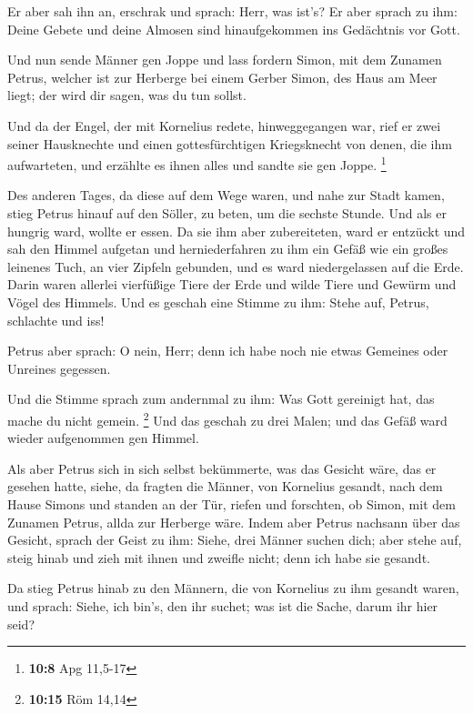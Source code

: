  Er aber sah ihn an, erschrak und sprach: Herr, was ist's?
Er aber sprach zu ihm: Deine Gebete und deine Almosen sind
hinaufgekommen ins Gedächtnis vor Gott.

 Und nun sende Männer gen Joppe und lass fordern Simon,
mit dem Zunamen Petrus,  welcher ist zur Herberge bei
einem Gerber Simon, des Haus am Meer liegt; der wird dir sagen, was du
tun sollst.

 Und da der Engel, der mit Kornelius redete,
hinweggegangen war, rief er zwei seiner Hausknechte und einen
gottesfürchtigen Kriegsknecht von denen, die ihm aufwarteten,
 und erzählte es ihnen alles und sandte sie gen Joppe.
\footnote{\textbf{10:8} Apg 11,5-17}

 Des anderen Tages, da diese auf dem Wege waren, und nahe
zur Stadt kamen, stieg Petrus hinauf auf den Söller, zu beten, um die
sechste Stunde.  Und als er hungrig ward, wollte er
essen. Da sie ihm aber zubereiteten, ward er entzückt 
und sah den Himmel aufgetan und herniederfahren zu ihm ein Gefäß wie ein
großes leinenes Tuch, an vier Zipfeln gebunden, und es ward
niedergelassen auf die Erde.  Darin waren allerlei
vierfüßige Tiere der Erde und wilde Tiere und Gewürm und Vögel des
Himmels.  Und es geschah eine Stimme zu ihm: Stehe auf,
Petrus, schlachte und iss!

 Petrus aber sprach: O nein, Herr; denn ich habe noch nie
etwas Gemeines oder Unreines gegessen.

 Und die Stimme sprach zum andernmal zu ihm: Was Gott
gereinigt hat, das mache du nicht gemein. \footnote{\textbf{10:15} Röm
  14,14}  Und das geschah zu drei Malen; und das Gefäß
ward wieder aufgenommen gen Himmel.

 Als aber Petrus sich in sich selbst bekümmerte, was das
Gesicht wäre, das er gesehen hatte, siehe, da fragten die Männer, von
Kornelius gesandt, nach dem Hause Simons und standen an der Tür,
 riefen und forschten, ob Simon, mit dem Zunamen Petrus,
allda zur Herberge wäre.  Indem aber Petrus nachsann über
das Gesicht, sprach der Geist zu ihm: Siehe, drei Männer suchen dich;
 aber stehe auf, steig hinab und zieh mit ihnen und
zweifle nicht; denn ich habe sie gesandt.

 Da stieg Petrus hinab zu den Männern, die von Kornelius
zu ihm gesandt waren, und sprach: Siehe, ich bin's, den ihr suchet; was
ist die Sache, darum ihr hier seid?

